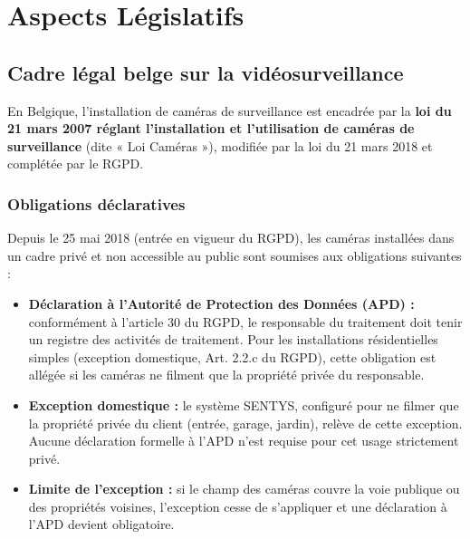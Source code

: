 \documentclass[12pt,a4paper]{article}
\begin{document}
\section{Aspects Législatifs}
\label{sec:legal}

\subsection{Cadre légal belge sur la vidéosurveillance}

En Belgique, l'installation de caméras de surveillance est encadrée par la \textbf{loi du 21 mars 2007 réglant l'installation et l'utilisation de caméras de surveillance} (dite « Loi Caméras »), modifiée par la loi du 21 mars 2018 et complétée par le RGPD.

\subsubsection{Obligations déclaratives}

Depuis le 25 mai 2018 (entrée en vigueur du RGPD), les caméras installées dans un cadre privé et non accessible au public sont soumises aux obligations suivantes :

\begin{itemize}[label=\textbullet]
    \item \textbf{Déclaration à l'Autorité de Protection des Données (APD) :} conformément à l'article 30 du RGPD, le responsable du traitement doit tenir un registre des activités de traitement. Pour les installations résidentielles simples (exception domestique, Art. 2.2.c du RGPD), cette obligation est allégée si les caméras ne filment que la propriété privée du responsable.
    \item \textbf{Exception domestique :} le système SENTYS, configuré pour ne filmer que la propriété privée du client (entrée, garage, jardin), relève de cette exception. Aucune déclaration formelle à l'APD n'est requise pour cet usage strictement privé.
    \item \textbf{Limite de l'exception :} si le champ des caméras couvre la voie publique ou des propriétés voisines, l'exception cesse de s'appliquer et une déclaration à l'APD devient obligatoire.
\end{itemize}
\end{document}
